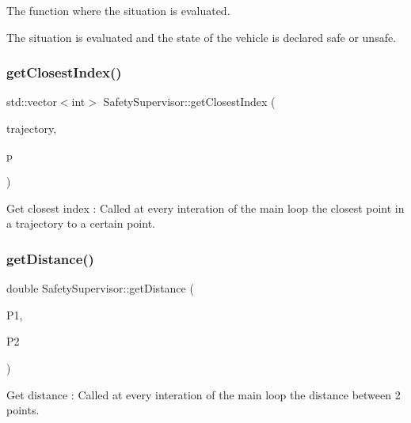 The function where the situation is evaluated. 

The situation is evaluated and the state of the vehicle is declared safe or unsafe. \mbox{\label{classSafetySupervisor_a295483f03590592f0850e9b7a6fd6fda}} 
\subsubsection{\texorpdfstring{get\+Closest\+Index()}{getClosestIndex()}}
{\footnotesize\ttfamily std\+::vector$<$int$>$ Safety\+Supervisor\+::get\+Closest\+Index (\begin{DoxyParamCaption}\item[{const std\+::vector$<$ Planner\+H\+N\+S\+::\+Way\+Point $>$ \&}]{trajectory,  }\item[{const Planner\+H\+N\+S\+::\+Way\+Point \&}]{p }\end{DoxyParamCaption})\hspace{0.3cm}{\ttfamily [inline]}}



Get closest index \+: Called at every interation of the main loop  the closest point in a trajectory to a certain point. 

\mbox{\label{classSafetySupervisor_ad19d9123b87d25820c764a314fd6a71c}} 
\subsubsection{\texorpdfstring{get\+Distance()}{getDistance()}}
{\footnotesize\ttfamily double Safety\+Supervisor\+::get\+Distance (\begin{DoxyParamCaption}\item[{const Planner\+H\+N\+S\+::\+Way\+Point \&}]{P1,  }\item[{const Planner\+H\+N\+S\+::\+Way\+Point \&}]{P2 }\end{DoxyParamCaption})\hspace{0.3cm}{\ttfamily [inline]}}



Get distance \+: Called at every interation of the main loop  the distance between 2 points. 


